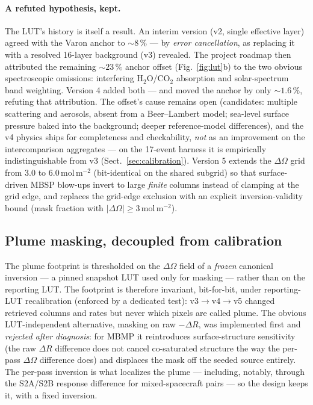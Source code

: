 \documentclass[11pt]{article}
\newcommand{\dR}{\Delta R}
\newcommand{\dOm}{\Delta\Omega}
\newcommand{\molm}{\ensuremath{\,\mathrm{mol\,m^{-2}}}}
\begin{document}
\paragraph{A refuted hypothesis, kept.}
The LUT's history is itself a result. An interim version (v2, single
effective layer) agreed with the Varon anchor to ${\sim}8\,\%$ --- by
\emph{error cancellation}, as replacing it with a resolved 16-layer
background (v3) revealed. The project roadmap then attributed the
remaining ${\sim}23\,\%$ anchor offset (Fig.~\ref{fig:lut}b) to the two
obvious spectroscopic omissions: interfering H$_2$O/CO$_2$ absorption and
solar-spectrum band weighting. Version 4 added both --- and moved the
anchor by only ${\sim}1.6\,\%$, refuting that attribution. The offset's
cause remains open (candidates: multiple scattering and aerosols, absent
from a Beer--Lambert model; sea-level surface pressure baked into the
background; deeper reference-model differences), and the v4 physics ships
for completeness and checkability, \emph{not} as an improvement on the
intercomparison aggregates
--- on the 17-event harness it is empirically indistinguishable from v3
(Sect.~\ref{sec:calibration}). Version 5 extends the $\dOm$ grid from 3.0
to 6.0\molm{} (bit-identical on the shared subgrid) so that surface-driven
MBSP blow-ups invert to large \emph{finite} columns instead of clamping at
the grid edge, and replaces the grid-edge exclusion with an explicit
inversion-validity bound (mask fraction with $|\dOm| \ge 3\molm$).

\subsection{Plume masking, decoupled from calibration}\label{sec:masking}

The plume footprint is thresholded on the $\dOm$ field of a \emph{frozen}
canonical inversion --- a pinned snapshot LUT used only for masking ---
rather than on the reporting LUT. The footprint is therefore invariant,
bit-for-bit, under reporting-LUT recalibration (enforced by a dedicated
test): v3$\to$v4$\to$v5 changed retrieved columns and rates but never
which pixels are called plume. The obvious LUT-independent alternative,
masking on raw $-\dR$, was implemented first and \emph{rejected after
diagnosis}: for MBMP it reintroduces surface-structure sensitivity (the
raw $\dR$ difference does not cancel co-saturated structure the way the
per-pass $\dOm$ difference does) and displaces the mask off the seeded
source entirely. The per-pass inversion is what localizes the plume ---
including, notably, through the S2A/S2B response difference for
mixed-spacecraft pairs --- so the design keeps it, with a fixed inversion.
\end{document}
